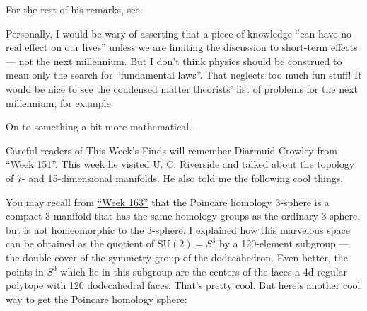 \documentclass{article}
\def\tightlist{}
\renewcommand{\texttt}[1]{%
  \begingroup
  \ttfamily
  \begingroup\lccode`~=`/\lowercase{\endgroup\def~}{/\discretionary{}{}{}}%
  \begingroup\lccode`~=`[\lowercase{\endgroup\def~}{[\discretionary{}{}{}}%
  \begingroup\lccode`~=`.\lowercase{\endgroup\def~}{.\discretionary{}{}{}}%
  \catcode`/=\active\catcode`[=\active\catcode`.=\active
  \scantokens{#1\noexpand}%
  \endgroup
}
\begin{document}
For the rest of his remarks, see:


Personally, I would be wary of asserting that a piece of knowledge ``can
have no real effect on our lives'' unless we are limiting the discussion
to short-term effects --- not the next millennium. But I don't think
physics should be construed to mean only the search for ``fundamental
laws''. That neglects too much fun stuff! It would be nice to see the
condensed matter theorists' list of problems for the next millennium,
for example.

On to something a bit more mathematical\ldots.

Careful readers of This Week's Finds will remember Diarmuid Crowley from
\protect\hyperlink{week151}{``Week 151''}. This week he visited U. C.
Riverside and talked about the topology of 7- and 15-dimensional
manifolds. He also told me the following cool things.

You may recall from \protect\hyperlink{week163}{``Week 163''} that the
Poincare homology 3-sphere is a compact 3-manifold that has the same
homology groups as the ordinary 3-sphere, but is not homeomorphic to the
3-sphere. I explained how this marvelous space can be obtained as the
quotient of \(\mathrm{SU}(2) = S^3\) by a 120-element subgroup --- the
double cover of the symmetry group of the dodecahedron. Even better, the
points in \(S^3\) which lie in this subgroup are the centers of the
faces a 4d regular polytope with 120 dodecahedral faces. That's pretty
cool. But here's another cool way to get the Poincare homology sphere:
\end{document}
